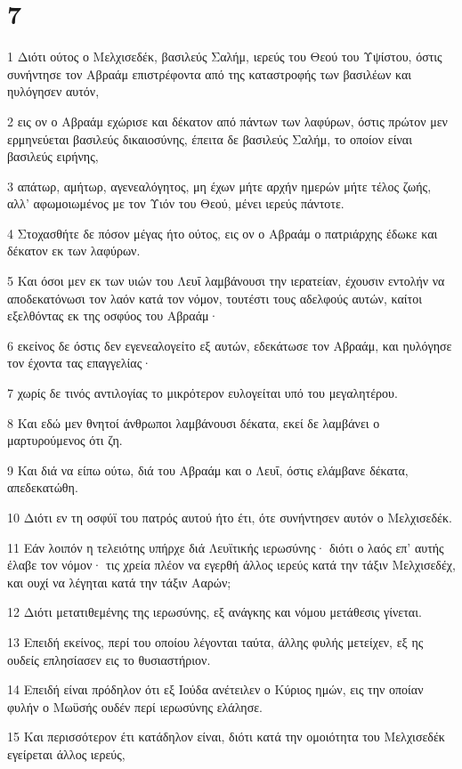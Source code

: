 \chapter{7}

\par 1 Διότι ούτος ο Μελχισεδέκ, βασιλεύς Σαλήμ, ιερεύς του Θεού του Υψίστου, όστις συνήντησε τον Αβραάμ επιστρέφοντα από της καταστροφής των βασιλέων και ηυλόγησεν αυτόν,
\par 2 εις ον ο Αβραάμ εχώρισε και δέκατον από πάντων των λαφύρων, όστις πρώτον μεν ερμηνεύεται βασιλεύς δικαιοσύνης, έπειτα δε βασιλεύς Σαλήμ, το οποίον είναι βασιλεύς ειρήνης,
\par 3 απάτωρ, αμήτωρ, αγενεαλόγητος, μη έχων μήτε αρχήν ημερών μήτε τέλος ζωής, αλλ' αφωμοιωμένος με τον Υιόν του Θεού, μένει ιερεύς πάντοτε.
\par 4 Στοχασθήτε δε πόσον μέγας ήτο ούτος, εις ον ο Αβραάμ ο πατριάρχης έδωκε και δέκατον εκ των λαφύρων.
\par 5 Και όσοι μεν εκ των υιών του Λευΐ λαμβάνουσι την ιερατείαν, έχουσιν εντολήν να αποδεκατόνωσι τον λαόν κατά τον νόμον, τουτέστι τους αδελφούς αυτών, καίτοι εξελθόντας εκ της οσφύος του Αβραάμ·
\par 6 εκείνος δε όστις δεν εγενεαλογείτο εξ αυτών, εδεκάτωσε τον Αβραάμ, και ηυλόγησε τον έχοντα τας επαγγελίας·
\par 7 χωρίς δε τινός αντιλογίας το μικρότερον ευλογείται υπό του μεγαλητέρου.
\par 8 Και εδώ μεν θνητοί άνθρωποι λαμβάνουσι δέκατα, εκεί δε λαμβάνει ο μαρτυρούμενος ότι ζη.
\par 9 Και διά να είπω ούτω, διά του Αβραάμ και ο Λευΐ, όστις ελάμβανε δέκατα, απεδεκατώθη.
\par 10 Διότι εν τη οσφύϊ του πατρός αυτού ήτο έτι, ότε συνήντησεν αυτόν ο Μελχισεδέκ.
\par 11 Εάν λοιπόν η τελειότης υπήρχε διά Λευϊτικής ιερωσύνης· διότι ο λαός επ' αυτής έλαβε τον νόμον· τις χρεία πλέον να εγερθή άλλος ιερεύς κατά την τάξιν Μελχισεδέχ, και ουχί να λέγηται κατά την τάξιν Ααρών;
\par 12 Διότι μετατιθεμένης της ιερωσύνης, εξ ανάγκης και νόμου μετάθεσις γίνεται.
\par 13 Επειδή εκείνος, περί του οποίου λέγονται ταύτα, άλλης φυλής μετείχεν, εξ ης ουδείς επλησίασεν εις το θυσιαστήριον.
\par 14 Επειδή είναι πρόδηλον ότι εξ Ιούδα ανέτειλεν ο Κύριος ημών, εις την οποίαν φυλήν ο Μωϋσής ουδέν περί ιερωσύνης ελάλησε.
\par 15 Και περισσότερον έτι κατάδηλον είναι, διότι κατά την ομοιότητα του Μελχισεδέκ εγείρεται άλλος ιερεύς,
